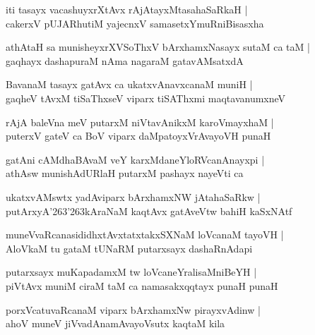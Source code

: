 \begin{shloka}
iti tasayx vacashuyxrXtAvx rAjAtayxMtasahaSaRkaH |\\
cakerxV pUJARhutiM yajecnxV samasetxYmuRniBisasxha
\end{shloka}

\begin{shloka}
athAtaH sa munisheyxrXVSoThxV bArxhamxNasayx sutaM ca taM |\\
gaqhayx dashapuraM nAma nagaraM gatavAMsatxdA
\end{shloka}

\begin{shloka}
BavanaM tasayx gatAvx ca ukatxvAnavxcanaM muniH |\\
gaqheV tAvxM tiSaThxseV viparx tiSAThxmi maqtavanumxneV
\end{shloka}

\begin{shloka}
rAjA baleVna meV putarxM niVtavAnikxM karoVmayxhaM |\\
puterxV gateV ca BoV viparx daMpatoyxVrAvayoVH punaH 
\end{shloka}

\begin{shloka}
gatAni cAMdhaBAvaM veY karxMdaneYloRVcanAnayxpi |\\
athAsw munishAdURlaH putarxM pashayx nayeVti ca
\end{shloka}

\begin{shloka}
ukatxvAMswtx yadAviparx bArxhamxNW jAtahaSaRkw |\\
putArxyA\char'263\char'263kAraNaM kaqtAvx gatAveVtw bahiH kaSxNAtf
\end{shloka}

\begin{shloka}
muneVvaRcanasididhxtAvxtatxtakxSXNaM loVcanaM tayoVH |\\
AloVkaM tu gataM tUNaRM putarxsayx dashaRnAdapi
\end{shloka}

\begin{shloka}
putarxsayx muKapadamxM tw loVcaneYralisaMniBeYH |\\
piVtAvx muniM ciraM taM ca namasakxqqtayx punaH punaH
\end{shloka}

\begin{shloka}
porxVcatuvaRcanaM viparx bArxhamxNw pirayxvAdinw |\\
ahoV muneV jiVvadAnamAvayoVsutx kaqtaM kila
\end{shloka}

